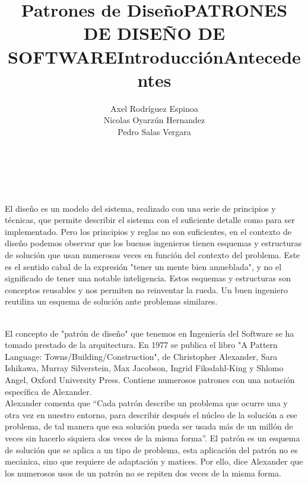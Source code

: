 \documentclass[a4paper,11pt]{report}
\begin{document}
\title{Patrones de Diseño}
\author{Axel Rodríguez Espinoa\\
        Nicolas Oyarzún Hernandez\\
        Pedro Salas Vergara}
\maketitle

\title {\textbf{PATRONES DE DISEÑO DE SOFTWARE}}\\

\title{\textbf{Introducción}}\\

El diseño es un modelo del sistema, realizado con una serie de principios y técnicas, que permite describir el sistema con el suficiente detalle como para ser implementado. Pero los principios y reglas no son suficientes, en el contexto de diseño podemos observar que los buenos ingenieros tienen esquemas y estructuras de solución que usan numerosas veces en función del contexto del problema. Este es el sentido cabal de la expresión "tener un mente bien amueblada", y no el significado de tener una notable inteligencia. Estos esquemas y estructuras son conceptos reusables y nos permiten no reinventar la rueda. Un buen ingeniero reutiliza un esquema de solución ante problemas similares.\\

\title{\textbf{Antecedentes}}\\

El concepto de "patrón de diseño" que tenemos en Ingeniería del Software se ha tomado prestado de la arquitectura. En 1977 se publica el libro "A Pattern Language: Towns/Building/Construction", de Christopher Alexander, Sara Ishikawa, Murray Silverstein, Max Jacobson, Ingrid Fiksdahl-King y Shlomo Angel, Oxford University Press. Contiene numerosos patrones con una notación específica de Alexander.\\

Alexander comenta que “Cada patrón describe un problema que ocurre una y otra vez en nuestro entorno, para describir después el núcleo de la solución a ese problema, de tal manera que esa solución pueda ser usada más de un millón de veces sin hacerlo siquiera dos veces de la misma forma”. El patrón es un esquema de solución que se aplica a un tipo de problema, esta aplicación del patrón no es mecánica, sino que requiere de adaptación y matices. Por ello, dice Alexander que los numerosos usos de un patrón no se repiten dos veces de la misma forma.\\
\end{document}
